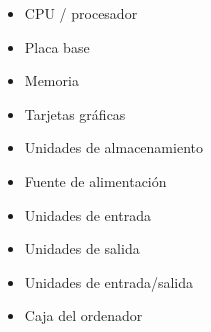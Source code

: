 \begin{itemize}
    \item CPU / procesador
    \item Placa base
    \item Memoria
    \item Tarjetas gráficas
    \item Unidades de almacenamiento
    \item Fuente de alimentación
    \item Unidades de entrada
    \item Unidades de salida
    \item Unidades de entrada/salida
    \item Caja del ordenador
\end{itemize}



%
%
%
%
%
%
%
%
%
